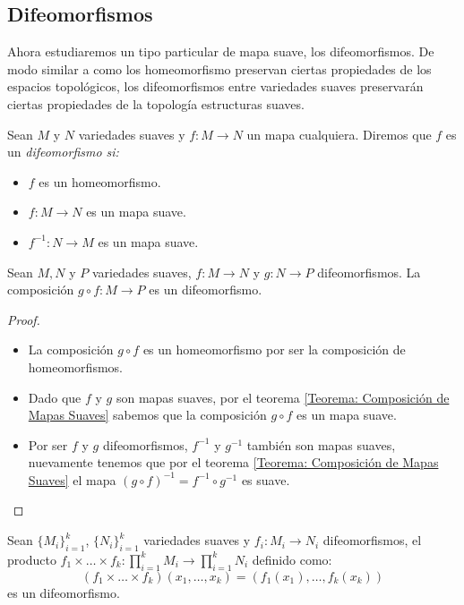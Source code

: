 \subsection{Difeomorfismos}\label{Subsección: Difeomorfismos}
Ahora estudiaremos un tipo particular de mapa suave, los difeomorfismos. De modo similar a como los homeomorfismo preservan ciertas propiedades de los espacios topológicos, los difeomorfismos entre variedades suaves preservarán ciertas propiedades de la topología estructuras suaves.

\begin{definition}[Difeomorfismo]\label{Definición: Difeomorfismo}
  Sean $M$ y $N$ variedades suaves y $f: M \to N$ un mapa cualquiera. Diremos que $f$ es un \it{difeomorfismo} si:
\begin{itemize}
  \item $f$ es un homeomorfismo.
  \item $f: M \to N$ es un mapa suave.
  \item $f^{-1}: N \to M$ es un mapa suave.
\end{itemize}
\end{definition}

\begin{theorem}\label{Teorema: Composición de Difeomorfismos}
Sean $M, N$ y $P$ variedades suaves, $f: M \to N$ y $g: N \to P$ difeomorfismos. La composición $g \circ f: M \to P$ es un difeomorfismo.
\end{theorem}

\begin{proof}
\begin{itemize}
\item La composición $g \circ f$ es un homeomorfismo por ser la composición de homeomorfismos.
\item Dado que $f$ y $g$ son mapas suaves, por el teorema \ref{Teorema: Composición de Mapas Suaves} sabemos que la composición $g \circ f$ es un mapa suave.
\item Por ser $f$ y $g$ difeomorfismos, $f^{-1}$ y $g^{-1}$ también son mapas suaves, nuevamente tenemos que por el teorema \ref{Teorema: Composición de Mapas Suaves} el mapa $(g\circ f)^{-1} = f^{-1} \circ g^{-1}$ es suave.
\end{itemize}
\end{proof}

\begin{theorem}
  Sean $\{M_i\}_{i=1}^{k}$, $\{N_i\}_{i=1}^{k}$ variedades suaves y $f_i: M_i \to N_i$ difeomorfismos, el producto $f_1 \times \dots \times f_k: \prod_{i=1}^{k} M_i \to \prod_{i=1}^{k} N_i$ definido como:
  \[
    (f_1 \times \dots \times f_k)(x_1, \dots, x_k) = (f_1(x_1), \dots, f_k(x_k))
  \]
  es un difeomorfismo.
\end{theorem}

